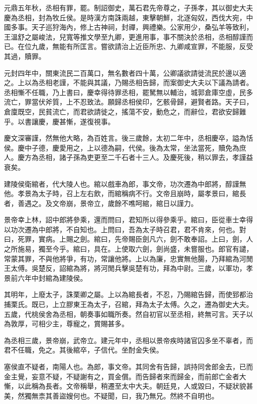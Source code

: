 元鼎五年秋，丞相有罪，罷。制詔御史，萬石君先帝尊之，子孫孝，其以御史大夫慶為丞相，封為牧丘侯。是時漢方南誅兩越，東擊朝鮮，北逐匈奴，西伐大宛，中國多事。天子巡狩海內，修上古神祠，封禪，興禮樂。公家用少，桑弘羊等致利，王溫舒之屬峻法，兒寬等推文學至九卿，更進用事，事不關決於丞相，丞相醇謹而已。在位九歲，無能有所匡言。嘗欲請治上近臣所忠、九卿咸宣罪，不能服，反受其過，贖罪。

元封四年中，關東流民二百萬口，無名數者四十萬，公卿議欲請徙流民於邊以適之。上以為丞相老謹，不能與其議，乃賜丞相告歸，而案御史大夫以下議為請者。丞相慚不任職，乃上書曰，慶幸得待罪丞相，罷駑無以輔治，城郭倉庫空虛，民多流亡，罪當伏斧質，上不忍致法。願歸丞相侯印，乞骸骨歸，避賢者路。天子曰，倉廩既空，民貧流亡，而君欲請徙之，搖蕩不安，動危之，而辭位，君欲安歸難乎。以書讓慶，慶甚慚，遂復視事。

慶文深審謹，然無他大略，為百姓言。後三歲餘，太初二年中，丞相慶卒，謚為恬侯。慶中子德，慶愛用之，上以德為嗣，代侯。後為太常，坐法當死，贖免為庶人。慶方為丞相，諸子孫為吏更至二千石者十三人。及慶死後，稍以罪去，孝謹益衰矣。

建陵侯衛綰者，代大陵人也。綰以戲車為郎，事文帝，功次遷為中郎將，醇謹無他。孝景為太子時，召上左右飲，而綰稱病不行。文帝且崩時，屬孝景曰，綰長者，善遇之。及文帝崩，景帝立，歲餘不噍呵綰，綰日以謹力。

景帝幸上林，詔中郎將參乘，還而問曰，君知所以得參乘乎。綰曰，臣從車士幸得以功次遷為中郎將，不自知也。上問曰，吾為太子時召君，君不肯來，何也。對曰，死罪，實病。上賜之劍。綰曰，先帝賜臣劍凡六，劍不敢奉詔。上曰，劍，人之所施易，獨至今乎。綰曰，具在。上使取六劍，劍尚盛，未嘗服也。郎官有譴，常蒙其罪，不與他將爭，有功，常讓他將。上以為廉，忠實無他腸，乃拜綰為河閒王太傅。吳楚反，詔綰為將，將河閒兵擊吳楚有功，拜為中尉。三歲，以軍功，孝景前六年中封綰為建陵侯。

其明年，上廢太子，誅栗卿之屬。上以為綰長者，不忍，乃賜綰告歸，而使郅都治捕栗氏。既已，上立膠東王為太子，召綰，拜為太子太傅。久之，遷為御史大夫。五歲，代桃侯舍為丞相，朝奏事如職所奏。然自初官以至丞相，終無可言。天子以為敦厚，可相少主，尊寵之，賞賜甚多。

為丞相三歲，景帝崩，武帝立。建元年中，丞相以景帝疾時諸官囚多坐不辜者，而君不任職，免之。其後綰卒，子信代。坐酎金失侯。

塞侯直不疑者，南陽人也。為郎，事文帝。其同舍有告歸，誤持同舍郎金去，已而金主覺，妄意不疑，不疑謝有之，買金償。而告歸者來而歸金，而前郎亡金者大慚，以此稱為長者。文帝稱舉，稍遷至太中大夫。朝廷見，人或毀曰，不疑狀貌甚美，然獨無柰其善盜嫂何也。不疑聞，曰，我乃無兄。然終不自明也。

